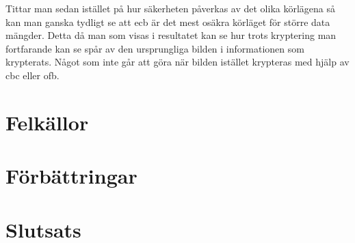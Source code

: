 Tittar man sedan istället på hur säkerheten påverkas av det olika körlägena så kan man ganska tydligt se att \acrshort{ecb} är det mest osäkra körläget för större data mängder.
Detta då man som visas i resultatet kan se hur trots kryptering man fortfarande kan se spår av den ursprungliga bilden i informationen som krypterats. Något som inte
går att göra när bilden istället krypteras med hjälp av \acrshort{cbc} eller \acrshort{ofb}.




\section{Felkällor} %


\section{Förbättringar} %


\section{Slutsats}

